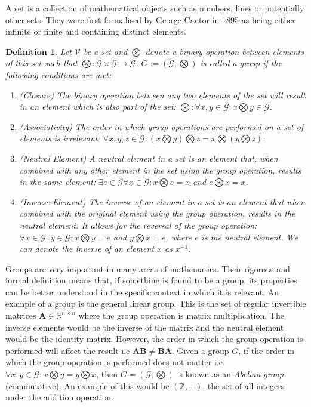 \documentclass[a4paper,12pt]{article}
\newcommand{\set}[1]{\mathcal{#1}}
\newcommand{\operation}{\bigotimes}
\newcommand{\matrx}[1]{\bm{#1}}
\newcommand{\real}{\mathbb{R}}
\newcommand{\integers}{\mathbb{Z}}
\newcommand{\italic}[1]{\textit{#1}}
\newtheorem{definition}{Definition}[section]
\begin{document}
	A set is a collection of mathematical objects such as numbers, lines or potentially other sets. They were first formalised by George Cantor in 
	1895 \cite{def_set_cantor} as being either infinite or finite and containing distinct elements. 
	\begin{definition}\normalfont
		Let $ \mathcal{V} $ be a set and $ \operation $ denote a binary operation between elements of this set such that $ \operation : \set{G} \times \set{G} \rightarrow \set{G} $. $G := (\set{G}, \operation)$ is called a group  \cite{def_group} if the following conditions are met:
		\begin{enumerate}
			\item (Closure) The binary operation between any two elements of the set will result in an element which is also part of the set: $ \operation : \forall x,y \in \set{G} : x \operation y \in \set{G} $.
			\item (Associativity) The order in which group operations are performed on a set of elements is irrelevant: $ \forall x, y, z \in \set{G} : (x \operation y) \operation z = x \operation (y \operation z) $.
			\item (Neutral Element) A neutral element in a set is an element that, when combined with any other element in the set using the group operation, results in the same element: $ \exists e  \in \set{G} \forall x \in \set{G} : x \operation e = x$ and $ e \operation x = x $.
			\item (Inverse Element) The inverse of an element in a set is an element that when combined with the original element using the group operation, results in the neutral element. It allows for the reversal of the group operation: $ \forall x \in \set{G} \exists y \in \set{G} :  x \operation y = e$ and $ y \operation x = e $, where $ e $ is the neutral element. We can denote the inverse of an element $ x $ as $ x^{-1} $.
		\end{enumerate}
	\end{definition}
	
	Groups are very important in many areas of mathematics. Their rigorous and formal definition means that, if something is found to be a group, its properties can be better understood in the specific context in which it is relevant.
	An example of a group is the general linear group. This is the set of regular invertible matrices $ \matrx{A} \in \real^{n \times n} $ where the group operation is matrix multiplication. The inverse elements would be the inverse of the matrix and the neutral element would be the identity matrix. However, the order in which the group operation is performed will affect the result i.e $ \matrx{AB} \ne \matrx{BA} $. 
	Given a group $ G $, if the order in which the group operation is performed does not matter i.e. $ \forall x, y \in \set{G} : x \operation y = y \operation x $, then $ G = (\set{G}, \operation) $ is known as an \italic{Abelian group} (commutative). An example of this would be $ (\integers, +) $, the set of all integers under the addition operation.
	
\end{document}
